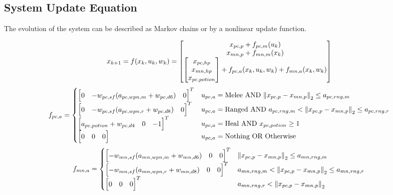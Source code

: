 \documentclass[letterpaper, 10 pt, conference]{ieeeconf}
\begin{document}
\subsection{System Update Equation}
The evolution of the system can be described as Markov chains or by a nonlinear update function.

\begin{figure}[t]
    \begin{equation}\label{eq:sys_update_fun}
        x_{k+1} = f(x_k, u_k, w_k) = \mqty[
            x_{pc,p} + f_{pc,m}(u_k)\\
            x_{mn,p} + f_{mn,m}(x_k)\\
            \mqty[x_{pc,hp}\\ x_{mn,hp} \\ x_{pc,potion}] + f_{pc,a}(x_k,u_k,w_k) + f_{mn,a}(x_k,w_k)
        ]
    \end{equation}
    \begin{equation}\label{eq:f_pc_a}
        f_{pc,a} = \begin{cases}
            \mqty[0 & -w_{pc,sf}(a_{pc,wpn,m} + w_{pc,d6}) & 0]^T & u_{pc,a} = \text{Melee} \text{ AND } \norm{x_{pc,p} - x_{mn,p}}_2 \leq a_{pc,rng,m}\\
            \mqty[0 & -w_{pc,sf}(a_{pc,wpn,r} + w_{pc,d8}) & 0]^T & u_{pc,a} = \text{Ranged} \text{ AND } a_{pc,rng,m} < \norm{x_{pc,p} - x_{mn,p}}_2 \leq a_{pc,rng,r}\\
            \mqty[a_{pc,potion} + w_{pc,d4} & 0 & -1]^T & u_{pc,a} = \text{Heal} \text{ AND } x_{pc,potion} \geq 1\\%
            \mqty[0 & 0 & 0] & u_{pc,a} = \text{Nothing} \text{ OR } \text{Otherwise}
        \end{cases}
    \end{equation}
    \begin{equation}\label{eq:f_mn_a}
        f_{mn,a} = \begin{cases}
            \mqty[-w_{mn,sf}(a_{mn,wpn,m} + w_{mn,d6}) & 0 & 0]^T & \norm{x_{pc,p} - x_{mn,p}}_2 \leq a_{mn,rng,m}\\
            \mqty[- w_{mn,sf}(a_{mn,wpn,r} + w_{mn,d8}) & 0 & 0]^T & a_{mn,rng,m} < \norm{x_{pc,p} - x_{mn,p}}_2 \leq  a_{mn,rng,r}\\
            \mqty[0 & 0 & 0]^T &  a_{mn,rng,r} < \norm{x_{pc,p} - x_{mn,p}}_2
        \end{cases}
    \end{equation}
\end{figure}
\end{document}

